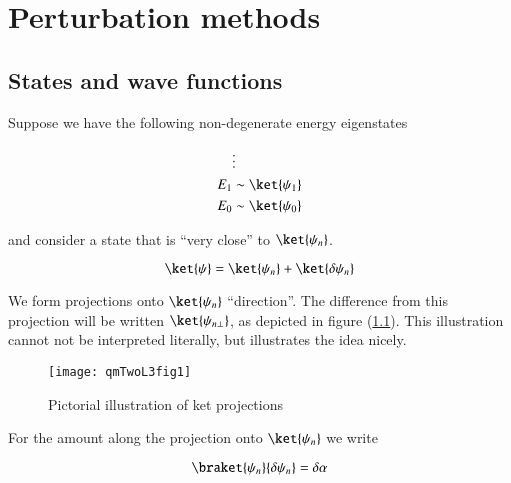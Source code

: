 %
%

\chapter{Perturbation methods}
\label{chap:qmTwoL3}
{}
\date{Sept 19, 2011}

\beginArtWithToc

\section{States and wave functions}

Suppose we have the following non-degenerate energy eigenstates

\begin{align*}
&\vdots \\
E_1 &\sim \ket{\psi_1} \\
E_0 &\sim \ket{\psi_0}
\end{align*}

and consider a state that is ``very close'' to $\ket{\psi_n}$.

\begin{equation}\label{eqn:qmTwoL3:10}
\ket{\psi} = \ket{\psi_n} + \ket{\delta \psi_n}
\end{equation}

We form projections onto $\ket{\psi_n}$ ``direction''.  The difference from this projection will be written $\ket{\psi_{n \perp}}$, as depicted in figure (\ref{fig:qmTwoL3fig1}).  This illustration cannot not be interpreted literally, but illustrates the idea nicely.

\begin{figure}[htp]
\centering
\texttt{[image: qmTwoL3fig1]}
\caption{Pictorial illustration of ket projections}\label{fig:qmTwoL3fig1}
\end{figure}

For the amount along the projection onto $\ket{\psi_n}$ we write

\begin{equation}\label{eqn:qmTwoL3:30}
\braket{\psi_n}{\delta \psi_n} = \delta \alpha
\end{equation}

